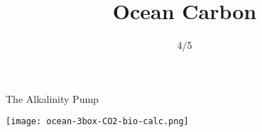 

\title{Ocean Carbon}
\author{4/5}



\begin{frame}{The Alkalinity Pump}
    
    \texttt{[image: ocean-3box-CO2-bio-calc.png]}
        
\end{frame}




